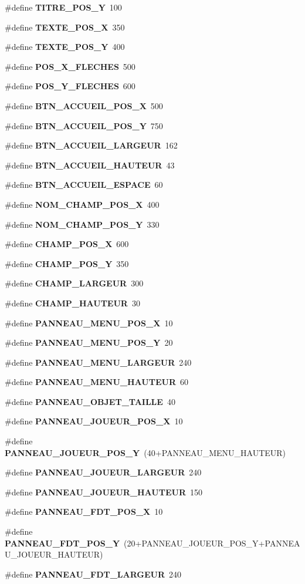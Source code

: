 \begin{CompactItemize}
\#define {\bf TITRE\_\-POS\_\-Y}~100
\item 
\#define {\bf TEXTE\_\-POS\_\-X}~350
\item 
\#define {\bf TEXTE\_\-POS\_\-Y}~400
\item 
\#define {\bf POS\_\-X\_\-FLECHES}~500
\item 
\#define {\bf POS\_\-Y\_\-FLECHES}~600
\item 
\#define {\bf BTN\_\-ACCUEIL\_\-POS\_\-X}~500
\item 
\#define {\bf BTN\_\-ACCUEIL\_\-POS\_\-Y}~750
\item 
\#define {\bf BTN\_\-ACCUEIL\_\-LARGEUR}~162
\item 
\#define {\bf BTN\_\-ACCUEIL\_\-HAUTEUR}~43
\item 
\#define {\bf BTN\_\-ACCUEIL\_\-ESPACE}~60
\item 
\#define {\bf NOM\_\-CHAMP\_\-POS\_\-X}~400
\item 
\#define {\bf NOM\_\-CHAMP\_\-POS\_\-Y}~330
\item 
\#define {\bf CHAMP\_\-POS\_\-X}~600
\item 
\#define {\bf CHAMP\_\-POS\_\-Y}~350
\item 
\#define {\bf CHAMP\_\-LARGEUR}~300
\item 
\#define {\bf CHAMP\_\-HAUTEUR}~30
\item 
\#define {\bf PANNEAU\_\-MENU\_\-POS\_\-X}~10
\item 
\#define {\bf PANNEAU\_\-MENU\_\-POS\_\-Y}~20
\item 
\#define {\bf PANNEAU\_\-MENU\_\-LARGEUR}~240
\item 
\#define {\bf PANNEAU\_\-MENU\_\-HAUTEUR}~60
\item 
\#define {\bf PANNEAU\_\-OBJET\_\-TAILLE}~40
\item 
\#define {\bf PANNEAU\_\-JOUEUR\_\-POS\_\-X}~10
\item 
\#define {\bf PANNEAU\_\-JOUEUR\_\-POS\_\-Y}~(40+PANNEAU\_\-MENU\_\-HAUTEUR)
\item 
\#define {\bf PANNEAU\_\-JOUEUR\_\-LARGEUR}~240
\item 
\#define {\bf PANNEAU\_\-JOUEUR\_\-HAUTEUR}~150
\item 
\#define {\bf PANNEAU\_\-FDT\_\-POS\_\-X}~10
\item 
\#define {\bf PANNEAU\_\-FDT\_\-POS\_\-Y}~(20+PANNEAU\_\-JOUEUR\_\-POS\_\-Y+PANNEAU\_\-JOUEUR\_\-HAUTEUR)
\item 
\#define {\bf PANNEAU\_\-FDT\_\-LARGEUR}~240
\item 

\end{CompactItemize}
